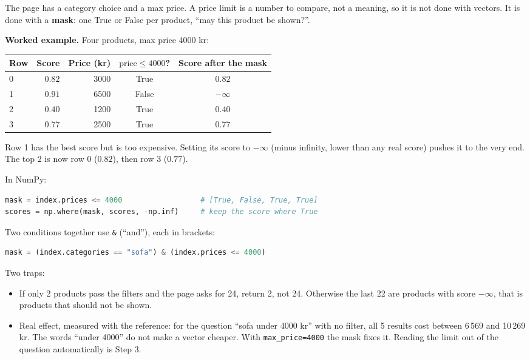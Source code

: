 \documentclass[11pt,a4paper]{article}
\newcommand{\code}[1]{\texttt{#1}}
\begin{document}
The page has a category choice and a max price. A price limit is a
number to compare, not a meaning, so it is not done with vectors. It is
done with a \textbf{mask}: one True or False per product, ``may this
product be shown?''.

\textbf{Worked example.} Four products, max price 4000 kr:
\begin{center}
\begin{tabular}{@{}lrrcc@{}}
\toprule
Row & Score & Price (kr) & $\text{price} \le 4000$? & Score after the mask \\
\midrule
0 & $0.82$ & 3000 & True  & $0.82$ \\
1 & $0.91$ & 6500 & False & $-\infty$ \\
2 & $0.40$ & 1200 & True  & $0.40$ \\
3 & $0.77$ & 2500 & True  & $0.77$ \\
\bottomrule
\end{tabular}
\end{center}
Row 1 has the best score but is too expensive. Setting its score to
$-\infty$ (minus infinity, lower than any real score) pushes it to the
very end. The top 2 is now row 0 ($0.82$), then row 3 ($0.77$).

In NumPy:
\begin{lstlisting}[language=Python]
mask = index.prices <= 4000                  # [True, False, True, True]
scores = np.where(mask, scores, -np.inf)     # keep the score where True
\end{lstlisting}
Two conditions together use \code{\&} (``and''), each in brackets:
\begin{lstlisting}[language=Python]
mask = (index.categories == "sofa") & (index.prices <= 4000)
\end{lstlisting}

Two traps:
\begin{itemize}[leftmargin=1.4em]
  \item If only 2 products pass the filters and the page asks for 24,
        return 2, not 24. Otherwise the last 22 are products with score
        $-\infty$, that is products that should not be shown.
  \item Real effect, measured with the reference: for the question
        ``sofa under 4000 kr'' with no filter, all 5 results cost between
        6\,569 and 10\,269 kr. The words ``under 4000'' do not make a
        vector cheaper. With \code{max\_price=4000} the mask fixes it.
        Reading the limit out of the question automatically is Step 3.
\end{itemize}
\end{document}
